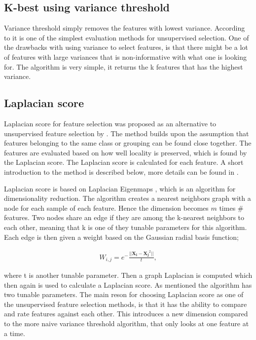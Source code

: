     
    \subsection{K-best using variance threshold}\label{subsec:var_thres}
        Variance threshold simply removes the features with lowest variance. According to \cite{He2005} it is one of the simplest evaluation methods for unsupervised selection. One of the drawbacks with using variance to select features, is that there might be a lot of features with large variances that is non-informative with what one is looking for. The algorithm is very simple, it returns the k features that has the highest variance. 
        
    
    \subsection{Laplacian score}\label{subsec:lapl_score}
        Laplacian score for feature selection was proposed as an alternative to unsupervised feature selection by \cite{He2005}. The method builds upon the assumption that features belonging to the same class or grouping can be found close together. The features are evaluated based on how well locality is preserved, which is found by the Laplacian score. The Laplacian score is calculated for each feature. A short introduction to the method is described below, more details can be found in \cite{He2005}. 
        
        Laplacian score is based on Laplacian Eigenmaps \cite{laplcian score for feature selection}, which is an algorithm for dimensionality reduction. The algorithm creates a nearest neighbors graph with a node for each sample of each feature. Hence the dimension becomes $m$ times $\#$features. Two nodes share an edge if they are among the k-nearest neighbors to each other, meaning that k is one of they tunable parameters for this algorithm. Each edge is then given a weight based on the Gaussian radial basis function;
        
        \begin{align}\label{eq:tech_LS}
            W_{i,j} = e^-{\frac{||{\bm{X_i}-\bm{X_j}}^2||}{t}},
        \end{align}
        
        where t is another tunable parameter. Then a graph Laplacian is computed which then again is used to calculate a Laplacian score. As mentioned the algorithm has two tunable parameters. The main reson for choosing Laplacian score as one of the unsupervised feature selection methods, is that it has the ability to compare and rate features against each other. This introduces a new dimension compared to the more naive variance threshold algorithm, that only looks at one feature at a time. 
    

